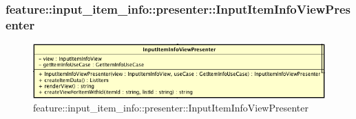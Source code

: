 \subsubsection{feature::input\_item\_info::presenter::InputItemInfoViewPresenter}

\label{feature::input_item_info::presenter::InputItemInfoViewPresenter}
\begin{figure}[H]
	\centering
	\includegraphics[scale=0.5]{Sezioni/SottosezioniST/img/app/InputInfoViewPresenter.png}
	\caption{feature::input\_item\_info::presenter::InputItemInfoViewPresenter}
\end{figure}

